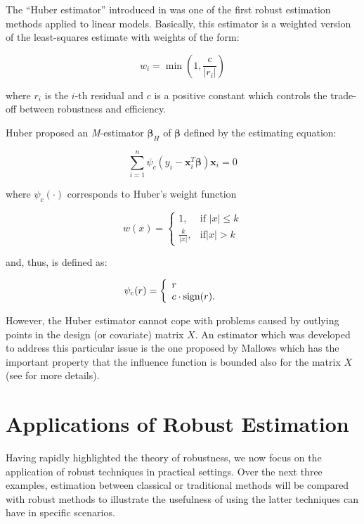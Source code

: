 \documentclass[]{book}
\theoremstyle{definition}
\theoremstyle{definition}
\theoremstyle{definition}
\theoremstyle{remark}
\begin{document}
The ``Huber estimator'' introduced in \citet{huber1973robust} was one of
the first robust estimation methods applied to linear models. Basically,
this estimator is a weighted version of the least-squares estimate with
weights of the form:

\[
w_{i} = \min \left(1,\frac{c}{|r_{i}|}\right)
\]

where \(r_{i}\) is the \(i\)-th residual and \(c\) is a positive
constant which controls the trade-off between robustness and efficiency.

Huber proposed an \textit{M}-estimator \(\hat{\boldsymbol{\beta}}_{H}\)
of \(\boldsymbol{\beta}\) defined by the estimating equation:

\[
    \sum_{i = 1}^{n} \psi_{c}\left(y_{i} - \mathbf{x}_{i}^{T} \boldsymbol{\beta} \right)\mathbf{x}_{i} = 0
\]

where \(\psi_{c}(\cdot)\) corresponds to Huber's weight function

\begin{equation}
w\left({x}\right) = \begin{cases}
1, &\text{if } \left|{x}\right| \le k \\
\frac{k}{\left|{x}\right|}, &\text{if} \left|{x}\right| > k
\end{cases}
\label{eq:huberweight}
\end{equation}

and, thus, is defined as:

\[
\psi_{c}(r) = \left\{  
\begin{array}{l l}
  r & \quad \\
  c \cdot \text{sign}(r). & \quad \\
\end{array} \right. 
\]

However, the Huber estimator cannot cope with problems caused by
outlying points in the design (or covariate) matrix \(X\). An estimator
which was developed to address this particular issue is the one proposed
by Mallows which has the important property that the influence function
is bounded also for the matrix \(X\) (see \citet{krasker1980estimation}
for more details).

\section{Applications of Robust
Estimation}\label{applications-of-robust-estimation}

Having rapidly highlighted the theory of robustness, we now focus on the
application of robust techniques in practical settings. Over the next
three examples, estimation between classical or traditional methods will
be compared with robust methods to illustrate the usefulness of using
the latter techniques can have in specific scenarios.
\end{document}
